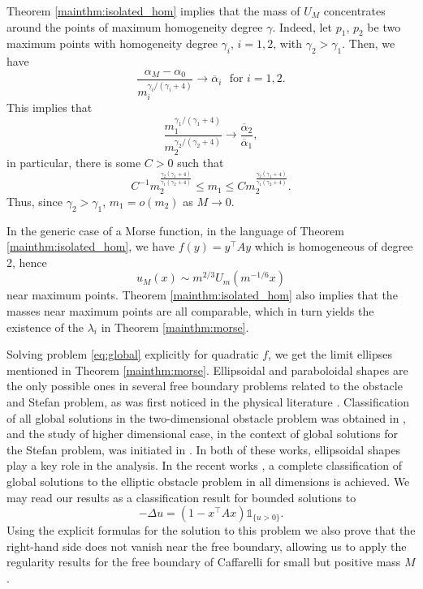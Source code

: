 \documentclass[10pt,a4paper]{article}
\newcommand{\faskip}{\hspace{8pt}}
\numberwithin{equation}{section}
\begin{document}
Theorem \ref{mainthm:isolated_hom} implies that the mass of $ U_M $ concentrates around the points of maximum homogeneity degree $ \gamma $. Indeed, let $ p_1 $, $ p_2 $ be two maximum points with homogeneity degree $ \gamma_i $, $ i=1,2 $, with $ \gamma_2 > \gamma_1 $. Then, we have
\[
	\frac{\alpha_M - \alpha_0}{m_i^{\gamma_i / (\gamma_i + 4)}} \rightarrow \overline{\alpha}_i \faskip \text{for }i=1,2.
\]
This implies that 
\[\frac{m_1^{\gamma_1/(\gamma_1 + 4)}}{m_2^{\gamma_2/(\gamma_2 + 4)}} \rightarrow \frac{\overline{\alpha}_2}{\overline{\alpha}_1},\]
in particular, there is some $ C > 0 $ such that
\[
	C^{-1} m_2^{\frac{\gamma_2(\gamma_1 + 4)}{\gamma_1(\gamma_2 + 4)}} \leq m_1 \leq C m_2^{\frac{\gamma_2(\gamma_1 + 4)}{\gamma_1(\gamma_2 + 4)}}.
\]
Thus, since $ \gamma_2 > \gamma_1 $, $ m_1 = o(m_2) $ as $ M \rightarrow 0$.

In the generic case of a Morse function, in the language of Theorem \ref{mainthm:isolated_hom}, we have $ f(y) = y^{\top}Ay $ which is homogeneous of degree 2, hence 
\[u_M(x) \sim m^{2/3} U_m(m^{-1/6}x)\]
near maximum points. Theorem \ref{mainthm:isolated_hom} also implies that the masses near maximum points are all comparable, which in turn yields the existence of the $ \lambda_i $ in Theorem \ref{mainthm:morse}. 

Solving problem \eqref{eq:global} explicitly for quadratic $f$, we get the limit ellipses mentioned in Theorem \ref{mainthm:morse}. Ellipsoidal and paraboloidal shapes are the only possible ones in several free boundary problems related to the obstacle and Stefan problem, as was first noticed in the physical literature \cite{Iva47,HC61}. Classification of all global solutions in the two-dimensional obstacle problem was obtained in \cite{Sak81}, and the study of higher dimensional case, in the context of global solutions for the Stefan problem, was initiated in \cite{DF86}. In both of these works, ellipsoidal shapes play a key role in the analysis. In the recent works \cite{ESW23, EFW25, SW25}, a complete classification of global solutions to the elliptic obstacle problem in all dimensions is achieved. We may read our results as a classification result for bounded solutions to
\[-\Delta u = \left( 1 - x^{\top}A x \right)\mathbb{1}_{\{u>0\}}. \]
Using the explicit formulas for the solution to this problem we also prove that the right-hand side does not vanish near the free boundary, allowing us to apply the regularity results for the free boundary of Caffarelli \cite{Caf77} for small but positive mass $M$. 
\end{document}
